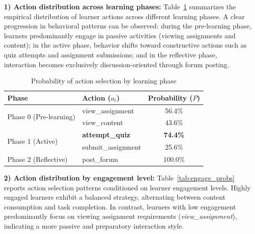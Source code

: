 \documentclass[9pt, conference, a4paper, compsocconf]{IEEEtran}
\begin{document}
\textbf{1) Action distribution across learning phases:}
Table~\ref{tab:phase_probs} summarizes the empirical distribution of learner actions across different learning phases. A clear progression in behavioral patterns can be observed: during the pre-learning phase, learners predominantly engage in passive activities (viewing assignments and content); in the active phase, behavior shifts toward constructive actions such as quiz attempts and assignment submissions; and in the reflective phase, interaction becomes exclusively discussion-oriented through forum posting.

\begin{table}[t]
\caption{Probability of action selection by learning phase}
\label{tab:phase_probs}
\centering
\begin{tabularx}{\columnwidth}{lXc}
\toprule
\textbf{Phase} & \textbf{Action ($a_t$)} & \textbf{Probability ($P$)} \\
\midrule
\multirow{2}{*}{Phase 0 (Pre-learning)} & view\_assignment & 56.4\% \\ 
& view\_content & 43.6\% \\
\midrule
\multirow{2}{*}{Phase 1 (Active)} & \textbf{attempt\_quiz} & \textbf{74.4\%} \\ 
& submit\_assignment & 25.6\% \\
\midrule
Phase 2 (Reflective) & post\_forum & 100.0\% \\
\bottomrule
\end{tabularx}
\end{table}

\textbf{2) Action distribution by engagement level:}
Table~\ref{tab:engage_probs} reports action selection patterns conditioned on learner engagement levels. Highly engaged learners exhibit a balanced strategy, alternating between content consumption and task completion. In contrast, learners with low engagement predominantly focus on viewing assignment requirements (\textit{view\_assignment}), indicating a more passive and preparatory interaction style.

\begin{table}[t]
\caption{Action probability distribution by engagement level}
\label{tab:engage_probs}
\begin{center}
\end{center}
\end{table}
\end{document}
